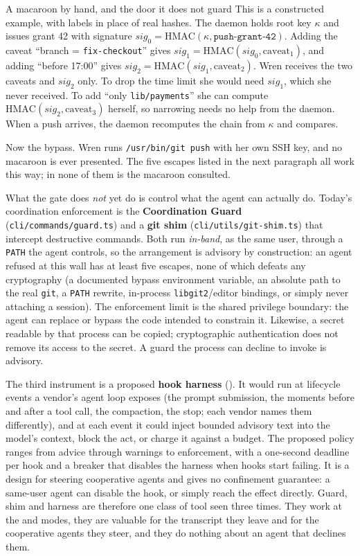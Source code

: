 \documentclass[11pt,a4paper]{article}
\theoremstyle{definition}
\theoremstyle{remark}
\begin{document}
\begin{pdexample}{A macaroon by hand, and the door it does not guard}
This is a constructed example, with labels in place of real hashes. The daemon
holds root key $\kappa$ and issues grant 42 with signature
$\mathit{sig}_0 = \mathrm{HMAC}(\kappa, \texttt{push-grant-42})$. Adding the caveat
``branch = \texttt{fix-checkout}'' gives
$\mathit{sig}_1 = \mathrm{HMAC}(\mathit{sig}_0, \text{caveat}_1)$, and adding
``before 17:00'' gives
$\mathit{sig}_2 = \mathrm{HMAC}(\mathit{sig}_1, \text{caveat}_2)$. Wren receives
the two caveats and $\mathit{sig}_2$ only. To drop the time limit she would need
$\mathit{sig}_1$, which she never received. To add ``only
\texttt{lib/payments}'' she can compute
$\mathrm{HMAC}(\mathit{sig}_2, \text{caveat}_3)$ herself, so narrowing needs no
help from the daemon. When a push arrives, the daemon recomputes the chain from
$\kappa$ and compares.

Now the bypass. Wren runs \texttt{/usr/bin/git push} with her own SSH key, and
no macaroon is ever presented. The five escapes listed in the next paragraph
all work this way; in none of them is the macaroon consulted.
\end{pdexample}

What the gate does \emph{not} yet do is control what the agent can actually do.
Today's coordination enforcement is the \textbf{Coordination Guard}
(\texttt{cli/commands/guard.ts}) and a \textbf{git shim}
(\texttt{cli/utils/git-shim.ts}) that intercept destructive commands. Both run
\emph{in-band}, as the same user, through a \texttt{PATH} the agent controls, so
the arrangement is advisory by construction: an agent refused at this wall has at
least five escapes, none of which defeats any cryptography (a documented bypass environment variable,
an absolute path to the real \texttt{git}, a \texttt{PATH} rewrite, in-process
\texttt{libgit2}/editor bindings, or simply never attaching a session). The
enforcement limit is the shared privilege boundary: the agent can replace or
bypass the code intended to constrain it. Likewise, a secret readable by that
process can be copied; cryptographic authentication does not remove its access
to the secret. A guard the process can decline to invoke is advisory.

The third instrument is a proposed \textbf{hook harness} (\Designed{}). It would
run at lifecycle events a vendor's agent loop exposes (the prompt
submission, the moments before and after a tool call, the compaction, the
stop; each vendor names them differently), and at each
event it could inject bounded advisory text into the model's context, block
the act, or charge it against a budget. The proposed policy ranges from advice
through warnings to enforcement, with a one-second deadline per hook and a
breaker that disables the harness when hooks start failing. It is a design for
steering cooperative agents and gives no confinement guarantee: a same-user agent
can disable the hook, or simply reach the effect directly. Guard, shim and harness
are therefore one class of tool seen three times. They work at the  and
 modes, they are valuable for the transcript they leave
and for the cooperative agents they steer, and they do nothing about an agent that
declines them.
\end{document}
